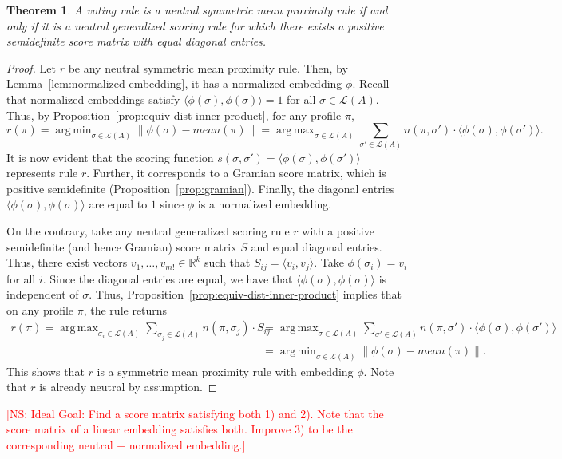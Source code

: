 \documentclass[10pt,letterpaper]{article}
\newcommand{\calL}{{\mathcal{L}}}
\newcommand{\rank}{{\calL(A)}}
\DeclareMathOperator*{\argmax}{arg\,max}
\DeclareMathOperator*{\argmin}{arg\,min}
\newtheorem{theorem}{Theorem}
\newcommand{\kibitz}[2]{\ifnum\Comments=1\textcolor{#1}{#2}\fi}
\newcommand{\cns}[1]{\kibitz{red} {[NS: #1]}}
\begin{document}
\begin{theorem}
A voting rule is a neutral symmetric mean proximity rule if and only if it is a neutral generalized scoring rule for which there exists a positive semidefinite score matrix with equal diagonal entries. 
\label{thm:psd}
\end{theorem}
\begin{proof}
Let $r$ be any neutral symmetric mean proximity rule. Then, by Lemma~\ref{lem:normalized-embedding}, it has a normalized embedding $\phi$. Recall that normalized embeddings satisfy $\langle \phi(\sigma),\phi(\sigma) \rangle = 1$ for all $\sigma \in \rank$. Thus, by Proposition~\ref{prop:equiv-dist-inner-product}, for any profile $\pi$,
$$
r(\pi) = \argmin_{\sigma \in \rank} \|\phi(\sigma)-mean(\pi)\| = \argmax_{\sigma \in \rank} \sum_{\sigma' \in \rank} n(\pi,\sigma') \cdot \langle \phi(\sigma),\phi(\sigma') \rangle.
$$
It is now evident that the scoring function $s(\sigma,\sigma') = \langle \phi(\sigma),\phi(\sigma') \rangle$ represents rule $r$. Further, it corresponds to a Gramian score matrix, which is positive semidefinite (Proposition~\ref{prop:gramian}). Finally, the diagonal entries $\langle \phi(\sigma),\phi(\sigma) \rangle$ are equal to $1$ since $\phi$ is a normalized embedding.

On the contrary, take any neutral generalized scoring rule $r$ with a positive semidefinite (and hence Gramian) score matrix $S$ and equal diagonal entries. Thus, there exist vectors $v_1,\ldots,v_{m!} \in \mathbb{R}^k$ such that $S_{ij} = \langle v_i,v_j \rangle$. Take $\phi(\sigma_i) = v_i$ for all $i$. Since the diagonal entries are equal, we have that $\langle \phi(\sigma),\phi(\sigma) \rangle$ is independent of $\sigma$. Thus, Proposition~\ref{prop:equiv-dist-inner-product} implies that on any profile $\pi$, the rule returns 
\begin{align*}
r(\pi) = \argmax_{\sigma_i \in \rank} \sum_{\sigma_j \in \rank} n(\pi,\sigma_j) \cdot S_{ij} &= \argmax_{\sigma \in \rank} \sum_{\sigma' \in \rank} n(\pi,\sigma') \cdot \langle \phi(\sigma),\phi(\sigma') \rangle \\
&= \argmin_{\sigma \in \rank} \|\phi(\sigma)-mean(\pi)\|.
\end{align*}
This shows that $r$ is a symmetric mean proximity rule with embedding $\phi$. Note that $r$ is already neutral by assumption. 
\end{proof}

\cns{Ideal Goal: Find a score matrix satisfying both 1) and 2). Note that the score matrix of a linear embedding satisfies both. Improve 3) to be the corresponding neutral + normalized embedding.}
\end{document}
